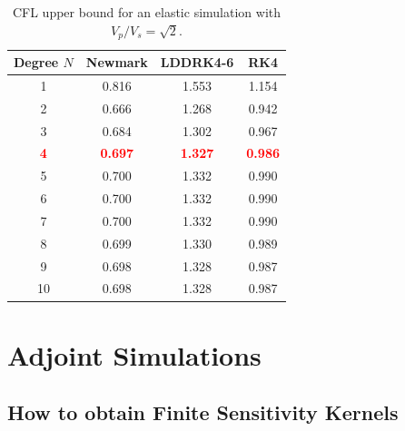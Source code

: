 \documentclass[oneside,english,onecolumn,letterpaper]{book}
\newcommand{\red}[1]{\textbf{\textcolor{Red}{#1}}}
\begin{document}
%
\begin{table}[hb]
\caption{CFL upper bound for an elastic simulation with $V_p/V_s = \sqrt{2}$.}
\centering
\begin{tabular}{c c c c}
\hline\hline
Degree $N$ & Newmark & LDDRK4-6 & RK4 \\ [0.5ex]
\hline
1 & 0.816 & 1.553 & 1.154 \\
2 & 0.666 & 1.268 & 0.942 \\
3 & 0.684 & 1.302 & 0.967 \\
\red{4} & \red{0.697} & \red{1.327} & \red{0.986} \\
5 & 0.700 & 1.332 & 0.990 \\
6 & 0.700 & 1.332 & 0.990 \\
7 & 0.700 & 1.332 & 0.990 \\
8 & 0.699 & 1.330 & 0.989 \\
9 & 0.698 & 1.328 & 0.987 \\
10 & 0.698 & 1.328 & 0.987 \\ [1ex]
\hline
\end{tabular}
\label{table:CFLelastic}
\end{table}



\chapter{Adjoint Simulations}



\section{How to obtain Finite Sensitivity Kernels}
\end{document}
